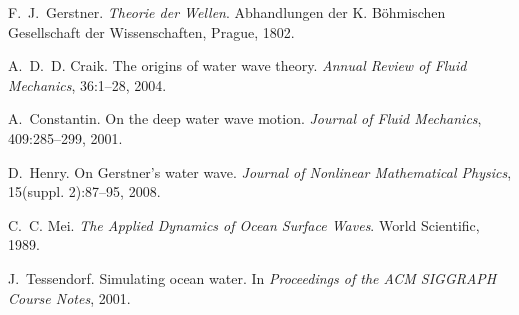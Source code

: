 \documentclass[11pt,letterpaper]{article}
\begin{document}
\clearpage

\begin{thebibliography}{99}

F.~J.~Gerstner. \emph{Theorie der Wellen}. Abhandlungen der K. B\"ohmischen Gesellschaft der Wissenschaften, Prague, 1802.

A.~D.~D. Craik. The origins of water wave theory. \emph{Annual Review of Fluid Mechanics}, 36:1--28, 2004.

A.~Constantin. On the deep water wave motion. \emph{Journal of Fluid Mechanics}, 409:285--299, 2001.

D.~Henry. On Gerstner’s water wave. \emph{Journal of Nonlinear Mathematical Physics}, 15(suppl. 2):87--95, 2008.

C.~C. Mei. \emph{The Applied Dynamics of Ocean Surface Waves}. World Scientific, 1989.

J.~Tessendorf. Simulating ocean water. In \emph{Proceedings of the ACM SIGGRAPH Course Notes}, 2001.

\end{thebibliography}
\end{document}
